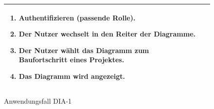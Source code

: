 \begin{figure}[h]
\begin{tabularx}{\textwidth}{ X | X }
		\begin{enumerate}
			\item Authentifizieren (passende Rolle).
			\item Der Nutzer wechselt in den Reiter der Diagramme.
			\item Der Nutzer wählt das Diagramm zum Baufortschritt eines Projektes.
			\item Das Diagramm wird angezeigt.
		\end{enumerate}  \\ \hline
		\end{tabularx}
	\caption{Anwendungsfall DIA-1}
	\label{fig:anwendungsfall-diagrammdarstellung-tabelle-DIA-1}
\end{figure}

\newpage

